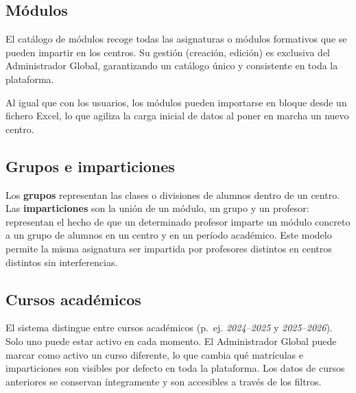 \documentclass[12pt, a4paper]{report}
\begin{document}

\subsection{Módulos}

El catálogo de módulos recoge todas las asignaturas o módulos formativos que se pueden
impartir en los centros. Su gestión (creación, edición) es exclusiva del Administrador
Global, garantizando un catálogo único y consistente en toda la plataforma.


Al igual que con los usuarios, los módulos pueden importarse en bloque desde un fichero
Excel, lo que agiliza la carga inicial de datos al poner en marcha un nuevo centro.


\subsection{Grupos e imparticiones}

Los \textbf{grupos} representan las clases o divisiones de alumnos dentro de un centro.
Las \textbf{imparticiones} son la unión de un módulo, un grupo y un profesor: representan
el hecho de que un determinado profesor imparte un módulo concreto a un grupo de alumnos
en un centro y en un período académico. Este modelo permite la misma asignatura ser
impartida por profesores distintos en centros distintos sin interferencias.



\subsection{Cursos académicos}

El sistema distingue entre cursos académicos (p.~ej. \textit{2024--2025} y
\textit{2025--2026}). Solo uno puede estar activo en cada momento. El Administrador
Global puede marcar como activo un curso diferente, lo que cambia qué matrículas e
imparticiones son visibles por defecto en toda la plataforma. Los datos de cursos
anteriores se conservan íntegramente y son accesibles a través de los filtros.
\end{document}
